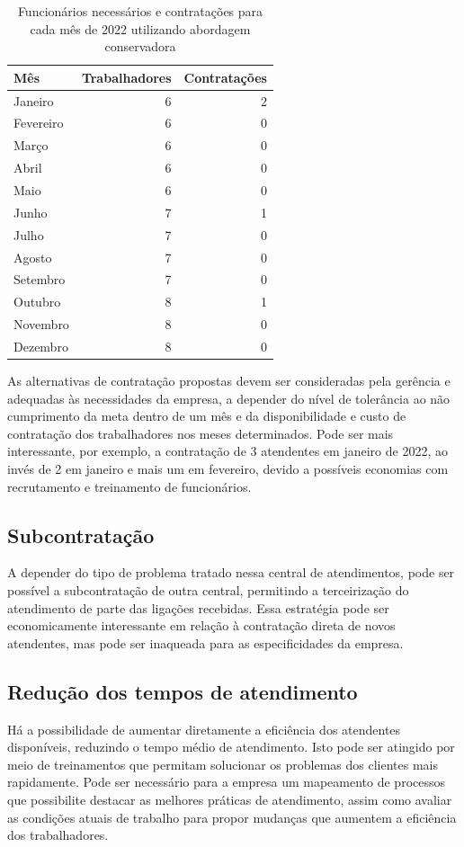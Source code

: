 \begin{table}[H]
    \centering
    \begin{tabular}{|l|r|r|}
    \hline
    \textbf{Mês} & \multicolumn{1}{l|}{\textbf{Trabalhadores}} & \multicolumn{1}{l|}{\textbf{Contratações}} \\ \hline
    Janeiro & 6 & 2 \\ \hline
    Fevereiro & 6 & 0 \\ \hline
    Março & 6 & 0 \\ \hline
    Abril & 6 & 0 \\ \hline
    Maio & 6 & 0 \\ \hline
    Junho & 7 & 1 \\ \hline
    Julho  & 7 & 0 \\ \hline
    Agosto & 7 & 0 \\ \hline
    Setembro & 7 & 0 \\ \hline
    Outubro & 8 & 1 \\ \hline
    Novembro & 8 & 0 \\ \hline
    Dezembro & 8 & 0 \\ \hline
    \end{tabular}
    \caption{Funcionários necessários e contratações para cada mês de 2022 utilizando abordagem conservadora}
    \label{tab: funcionarios-2022-economico}
    \end{table}

As alternativas de contratação propostas devem ser consideradas pela gerência e adequadas às necessidades da empresa, a depender do nível de tolerância ao não cumprimento da meta dentro de um mês e da disponibilidade e custo de contratação dos trabalhadores nos meses determinados. Pode ser mais interessante, por exemplo, a contratação de 3 atendentes em janeiro de 2022, ao invés de 2 em janeiro e mais um em fevereiro, devido a possíveis economias com recrutamento e treinamento de funcionários.

\subsection{Subcontratação}
A depender do tipo de problema tratado nessa central de atendimentos, pode ser possível a subcontratação de outra central, permitindo a terceirização do atendimento de parte das ligações recebidas. Essa estratégia pode ser economicamente interessante em relação à contratação direta de novos atendentes, mas pode ser inaqueada para as especificidades da empresa.

\subsection{Redução dos tempos de atendimento}
Há a possibilidade de aumentar diretamente a eficiência dos atendentes disponíveis, reduzindo o tempo médio de atendimento. Isto pode ser atingido por meio de treinamentos que permitam solucionar os problemas dos clientes mais rapidamente. Pode ser necessário para a empresa um mapeamento de processos que possibilite destacar as melhores práticas de atendimento, assim como avaliar as condições atuais de trabalho para propor mudanças que aumentem a eficiência dos trabalhadores.

